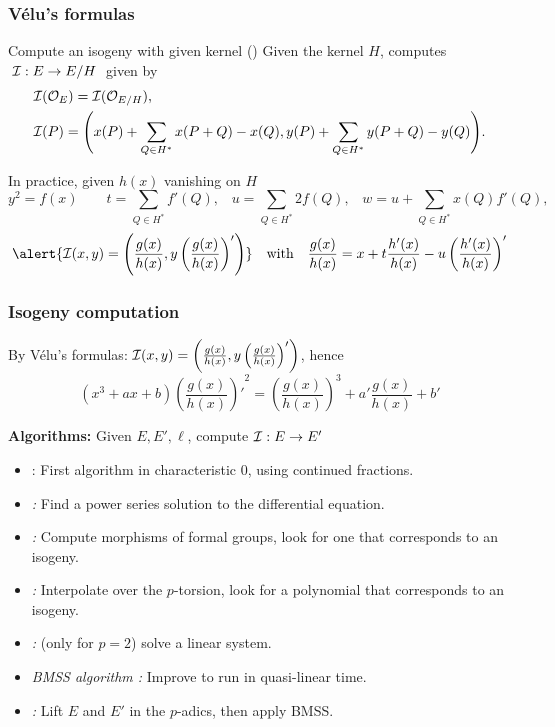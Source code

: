 \documentclass[10pt,usepdftitle=false]{beamer}
\begin{document}
\begin{frame}
  \frametitle{Vélu's formulas}
  
  \begin{block}{Compute an isogeny with given kernel (\cite{velu71})}
    Given the kernel $H$, computes $\;\mathcal{I} : E\to E/H\;$ given by
    \begin{align*}
      &\mathcal{I}(\mathcal{O}_E) = \mathcal{I}(\mathcal{O}_{E/H})\text{,}\\
      &\begin{aligned}
        \mathcal{I}(P) = \Biggl(x(P) + \sum_{Q\in H^\ast}x(P+Q) - x(Q),
        y(P) + \sum_{Q\in H^\ast}y(P+Q) - y(Q) \Biggr) \text{.}
      \end{aligned}
    \end{align*}
  \end{block}

  \begin{block}{In practice, given $h(x)$ vanishing on $H$}
    {\footnotesize
      \[
      y^2 = f(x)
      \qquad
      t = \sum_{Q\in H^\ast} f'(Q)\text{,}
      \quad
      u = \sum_{Q\in H^\ast} 2f(Q)\text{,}
      \quad
      w = u + \sum_{Q\in H^\ast} x(Q)f'(Q)\text{,}\]}
    \[\alert{\I(x,y) = \left(\frac{g(x)}{h(x)}, y\left(\frac{g(x)}{h(x)}\right)'\right)}
    \quad\text{with}\quad
    \frac{g(x)}{h(x)} = x + t\frac{h'(x)}{h(x)} - u\left(\frac{h'(x)}{h(x)}\right)'\]
  \end{block}
\end{frame}


\begin{frame}
  \frametitle{Isogeny computation}
  By Vélu's formulas: $\mathcal{I}(x,y) = \left(\frac{g(x)}{h(x)},
    y\left(\frac{g(x)}{h(x)}\right)'\right)$, hence
  \[(x^3 + ax + b){\left(\frac{g(x)}{h(x)}\right)'}^2 =
  \left(\frac{g(x)}{h(x)}\right)^3 + a'\frac{g(x)}{h(x)} + b'\]
  
  \begin{block}{\textbf{Algorithms:} Given $E, E', \ell$, compute $\mathcal{I}:E\to E'$}
    \begin{itemize}
    \item \emph{\cite{strak73}}: First algorithm in characteristic
      $0$, using continued fractions.
    \item \emph{\cite{elkies92,elkies98}:} Find a power series
      solution to the differential equation.
    \item \emph{\cite{couveignes94}:} Compute morphisms of formal
      groups, look for one that corresponds to an isogeny.
    \item \emph{\cite{couveignes96}:} Interpolate over the
      $p$-torsion, look for a polynomial that corresponds to an
      isogeny.
    \item \emph{\cite{lercier96}:} (only for $p=2$) solve a linear
      system.
    \item \emph{BMSS
        algorithm \parencite{bostan+morain+salvy+schost08}:} Improve
      \cite{elkies98} to run in quasi-linear time.
    \item \emph{\cite{lercier+sirvent08}:} Lift $E$ and $E'$ in the
      $p$-adics, then apply BMSS.
    \end{itemize}
  \end{block}
\end{frame}
\end{document}
